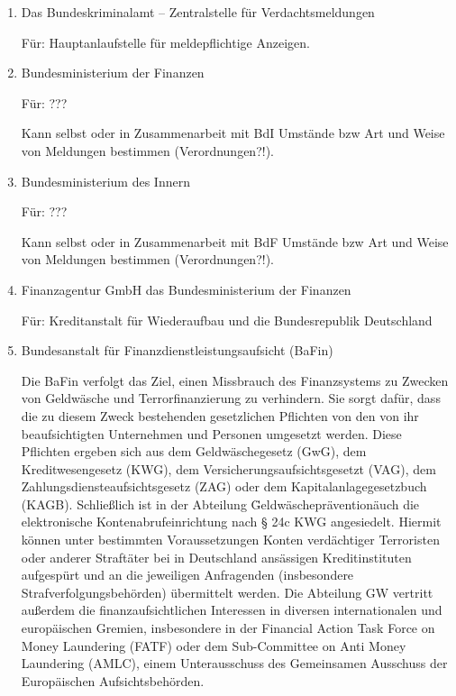 \documentclass{article}
\begin{document}
            \begin{enumerate}

                \item Das Bundeskriminalamt – Zentralstelle für Verdachtsmeldungen

                    Für: Hauptanlaufstelle für meldepflichtige Anzeigen.

                \item Bundesministerium der Finanzen

                    Für: ???

                    Kann selbst oder in Zusammenarbeit mit BdI Umstände bzw Art und Weise von Meldungen bestimmen (Verordnungen?!).

                \item Bundesministerium des Innern

                    Für: ???

                    Kann selbst oder in Zusammenarbeit mit BdF Umstände bzw Art und Weise von Meldungen bestimmen (Verordnungen?!).                

                \item Finanzagentur GmbH das Bundesministerium der Finanzen

                     Für: Kreditanstalt für Wiederaufbau und die Bundesrepublik Deutschland

                \item Bundesanstalt für Finanzdienstleistungsaufsicht (BaFin)

                    Die BaFin verfolgt das Ziel, einen Missbrauch des Finanzsystems zu Zwecken von Geldwäsche und Terrorfinanzierung zu verhindern. Sie sorgt dafür, dass die zu diesem Zweck bestehenden gesetzlichen Pflichten von den von ihr beaufsichtigten Unternehmen und Personen umgesetzt werden. Diese Pflichten ergeben sich aus dem Geldwäschegesetz (GwG), dem Kreditwesengesetz (KWG), dem Versicherungsaufsichtsgesetzt (VAG), dem Zahlungsdiensteaufsichtsgesetz (ZAG) oder dem Kapitalanlagegesetzbuch (KAGB). Schließlich ist in der Abteilung \"Geldwäscheprävention\" auch die elektronische Kontenabrufeinrichtung nach § 24c KWG angesiedelt. Hiermit können unter bestimmten Voraussetzungen Konten verdächtiger Terroristen oder anderer Straftäter bei in Deutschland ansässigen Kreditinstituten aufgespürt und an die jeweiligen Anfragenden (insbesondere Strafverfolgungsbehörden) übermittelt werden. Die Abteilung GW vertritt außerdem die finanzaufsichtlichen Interessen in diversen internationalen und europäischen Gremien, insbesondere in der Financial Action Task Force on Money Laundering (FATF) oder dem Sub-Committee on Anti Money Laundering (AMLC), einem Unterausschuss des Gemeinsamen Ausschuss der Europäischen Aufsichtsbehörden.
                   

\end{enumerate}
\end{document}
